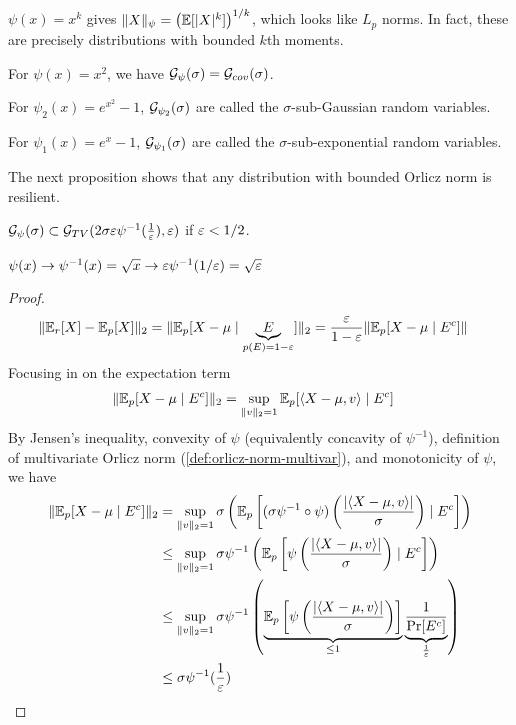 \begin{example}
    $\psi(x) = x^k$ gives $\|X\|_\psi = \left(\mathbb{E}[\lvert X \rvert^k]\right)^{1/k}$,
    which looks like $L_p$ norms. In fact, these are precisely distributions with bounded $k$th moments.
    
    For $\psi(x) = x^2$, we have $\mathcal{G}_{\psi}(\sigma) = \mathcal{G}_{cov}(\sigma)$.
\end{example}

\begin{definition}\label{def:sub-gaussian-sub-exp-orlicz}
    For $\psi_2(x) = e^{x^2} - 1$, $\mathcal{G}_{\psi_2}(\sigma)$ are called the $\sigma$-sub-Gaussian random variables.
    
    For $\psi_1(x) = e^x - 1$, $\mathcal{G}_{\psi_1}(\sigma)$ are called the $\sigma$-sub-exponential random variables.
\end{definition}

The next proposition shows that any distribution with bounded Orlicz norm is resilient.
\begin{proposition}\label{lem:orlicz-norm-resilient}
    $\mathcal{G}_{\psi}(\sigma) \subset \mathcal{G}_{TV}(2 \sigma \varepsilon \psi^{-1}(\frac{1}{\varepsilon}), \varepsilon)$
    if $\varepsilon < 1/2$.
    
    $\psi(x) \to \psi^{-1}(x) = \sqrt{x} \to \varepsilon \psi^{-1}(1/\varepsilon) = \sqrt{\varepsilon}$
\end{proposition}

\begin{proof}
    \begin{align}
        \|\mathbb{E}_r[X] - \mathbb{E}_p[X]\|_2
        &= \|\mathbb{E}_p[X - \mu \mid \underbrace{E}_{p(E) = 1 - \varepsilon} ]\|_2
        = \frac{\varepsilon}{1 - \varepsilon} \| \mathbb{E}_p [ X- \mu \mid E^c] \|
    \end{align}
    Focusing in on the expectation term
    \begin{align}
        \| \mathbb{E}_p[X - \mu \mid E^c] \|_2
        &= \sup_{\|v\|_2 = 1} \mathbb{E}_p[\braket{X - \mu, v} \mid E^c]
    \end{align}
    By Jensen's inequality, convexity of $\psi$ (equivalently concavity of $\psi^{-1}$),
    definition of multivariate Orlicz norm (\cref{def:orlicz-norm-multivar}),
    and monotonicity of $\psi$, we have
    \begin{align}
        \| \mathbb{E}_p[X - \mu \mid E^c] \|_2
        &= \sup_{\|v\|_2 = 1} \sigma \left(
            \mathbb{E}_p\left[(\sigma \psi^{-1} \circ \psi)\left( \frac{\lvert \braket{X - \mu, v} \rvert}{\sigma} \right) \mid E^c\right]
        \right) \\
        &\leq \sup_{\|v\|_2 = 1} \sigma \psi^{-1}\left(
            \mathbb{E}_p\left[\psi\left( \frac{\lvert \braket{X - \mu, v} \rvert}{\sigma} \right) \mid E^c\right]
        \right) \\
        &\leq \sup_{\|v\|_2 = 1} \sigma \psi^{-1}\left(
            \underbrace{\mathbb{E}_p\left[\psi\left( \frac{\lvert \braket{X - \mu, v} \rvert}{\sigma} \right) \right]}_{\leq 1}
            \underbrace{\frac{1}{\Pr[E^c]}}_{\frac{1}{\varepsilon}}
        \right) \\
        &\leq \sigma \psi^{-1}(\frac{1}{\varepsilon})
    \end{align}
\end{proof}